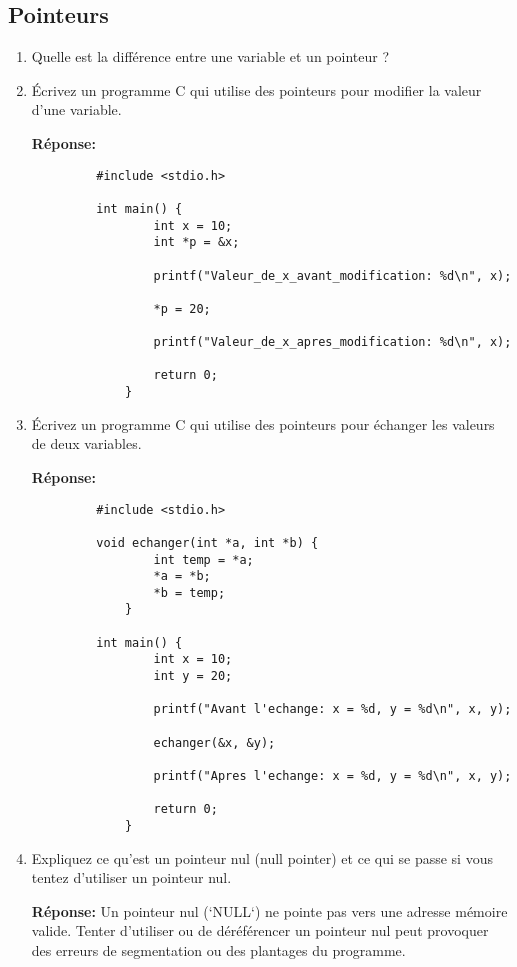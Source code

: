 \subsection{Pointeurs}
\begin{enumerate}
	\item Quelle est la différence entre une variable et un pointeur ?
	\item Écrivez un programme C qui utilise des pointeurs pour modifier la valeur d'une variable.
	
	 \textbf{Réponse:}
	 \begin{lstlisting}
		 #include <stdio.h>
		
		 int main() {
			     int x = 10;
			     int *p = &x; 
			
			     printf("Valeur_de_x_avant_modification: %d\n", x);
			
			     *p = 20;
			
			     printf("Valeur_de_x_apres_modification: %d\n", x);
			
			     return 0;
			 }
		 \end{lstlisting}
	
	\item Écrivez un programme C qui utilise des pointeurs pour échanger les valeurs de deux variables.
	
	 \textbf{Réponse:}
	 \begin{lstlisting}
		 #include <stdio.h>
		
		 void echanger(int *a, int *b) {
			     int temp = *a;
			     *a = *b;
			     *b = temp;
			 }
		
		 int main() {
			     int x = 10;
			     int y = 20;
			
			     printf("Avant l'echange: x = %d, y = %d\n", x, y);
			
			     echanger(&x, &y);
			
			     printf("Apres l'echange: x = %d, y = %d\n", x, y);
			
			     return 0;
			 }
		 \end{lstlisting}
	
	\item Expliquez ce qu'est un pointeur nul (null pointer) et ce qui se passe si vous tentez d'utiliser un pointeur nul.
	
	 \textbf{Réponse:} Un pointeur nul (`NULL`) ne pointe pas vers une adresse mémoire valide. Tenter d'utiliser ou de déréférencer un pointeur nul peut provoquer des erreurs de segmentation ou des plantages du programme.
\end{enumerate}

